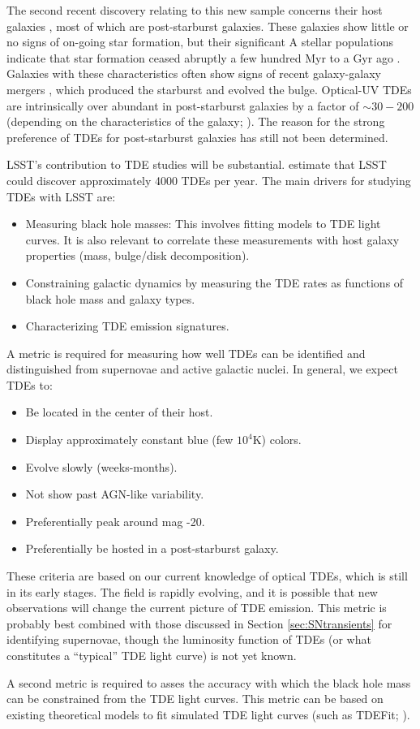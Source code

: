 The second recent discovery relating to this new sample concerns their
host galaxies \citep{Arcavi2014, French2016}, most of which are
post-starburst galaxies. These galaxies show little or no signs of on-going star formation, but their significant A stellar populations indicate that star formation ceased abruptly a few hundred Myr to a Gyr ago \citep{Dressler1983}. Galaxies with these characteristics often show signs of recent galaxy-galaxy mergers \citep{Zabludoff1996}, which produced the starburst and evolved the bulge. Optical-UV TDEs are intrinsically over abundant in post-starburst galaxies by a factor of $\sim30-200$ (depending on the characteristics of the galaxy; \citealt{French2016}). The reason for the strong preference of TDEs for post-starburst galaxies has still not been determined.

LSST's contribution to TDE studies will be substantial. \citet{VanVelzen2011} estimate that LSST could discover approximately 4000 TDEs per year. The main drivers for studying TDEs with LSST are:
\begin{itemize}
\item Measuring black hole masses: This involves fitting models to TDE light curves. It is also relevant to correlate these measurements with host galaxy properties (mass, bulge/disk decomposition). 
\item Constraining galactic dynamics by measuring the TDE rates as functions of black hole mass and galaxy types. 
\item Characterizing TDE emission signatures. 
\end{itemize}

A metric is required for measuring how well TDEs can be identified and distinguished from supernovae and active galactic nuclei. In general, we expect TDEs to:
\begin{itemize}
\item Be located in the center of their host.
\item Display approximately constant blue (few $10^4$K) colors.
\item Evolve slowly (weeks-months).
\item Not show past AGN-like variability.
\item Preferentially peak around mag -20.
\item Preferentially be hosted in a post-starburst galaxy.
\end{itemize}
These criteria are based on our current knowledge of optical TDEs, which is still in its early stages. The field is rapidly evolving, and it is possible that new observations will change the current picture of TDE emission. 
This metric is probably best combined with those discussed in Section \ref{sec:SNtransients} for identifying supernovae, though the luminosity function of TDEs (or what constitutes a ``typical'' TDE light curve) is not yet known.

A second metric is required to asses the accuracy with which the black hole mass can be constrained from the TDE light curves. This metric can be based on existing theoretical models to fit simulated TDE light curves (such as TDEFit; \citealt{Guillochon2014}). 


